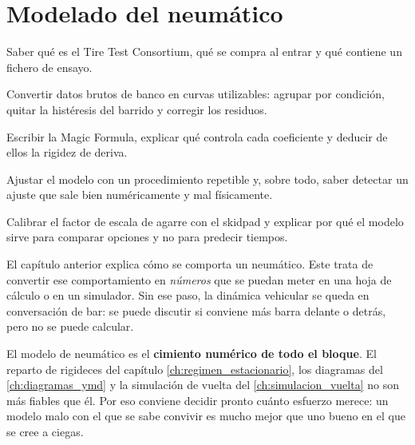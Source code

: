 \chapter{Modelado del neumático}
\label{ch:modelado_neumatico}


\begin{objetivos}
  \item Saber qué es el Tire Test Consortium, qué se compra al entrar y qué
        contiene un fichero de ensayo.
  \item Convertir datos brutos de banco en curvas utilizables: agrupar por
        condición, quitar la histéresis del barrido y corregir los residuos.
  \item Escribir la Magic Formula, explicar qué controla cada coeficiente y
        deducir de ellos la rigidez de deriva.
  \item Ajustar el modelo con un procedimiento repetible y, sobre todo, saber
        detectar un ajuste que sale bien numéricamente y mal físicamente.
  \item Calibrar el factor de escala de agarre con el skidpad y explicar por qué
        el modelo sirve para comparar opciones y no para predecir tiempos.
\end{objetivos}


El capítulo anterior explica cómo se comporta un neumático. Este trata de
convertir ese comportamiento en \emph{números} que se puedan meter en una hoja de
cálculo o en un simulador. Sin ese paso, la dinámica vehicular se queda en
conversación de bar: se puede discutir si conviene más barra delante o detrás,
pero no se puede calcular.

\begin{clave}
El modelo de neumático es el \textbf{cimiento numérico de todo el bloque}. El
reparto de rigideces del capítulo \ref{ch:regimen_estacionario}, los diagramas
del \ref{ch:diagramas_ymd} y la simulación de vuelta del
\ref{ch:simulacion_vuelta} no son más fiables que él. Por eso conviene decidir
pronto cuánto esfuerzo merece: un modelo malo con el que se sabe convivir es
mucho mejor que uno bueno en el que se cree a ciegas.
\end{clave}

